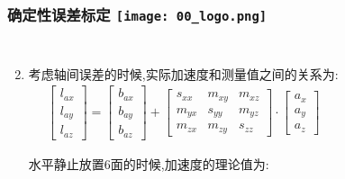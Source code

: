 \begin{comment}
\end{comment}
\begin{frame}
\frametitle{确定性误差标定 \hfill \texttt{[image: 00\_logo.png]}}
\begin{columns}
  
  
  \begin{enumerate}
    \setcounter{enumi}{1}
		\item 考虑轴间误差的时候,实际加速度和测量值之间的关系为:
		\begin{equation}
      \begin{split}
        \begin{bmatrix}
          l_{ax} \\ l_{ay} \\ l_{az}
        \end{bmatrix} = 
        \begin{bmatrix}
          b_{ax} \\ b_{ay} \\ b_{az}
        \end{bmatrix} +
        \begin{bmatrix}
          s_{xx} & m_{xy} & m_{xz} \\
          m_{yx} & s_{yy} & m_{yz} \\
          m_{zx} & m_{zy} & s_{zz}
        \end{bmatrix} \cdot 
        \begin{bmatrix}
          a_x \\ a_y \\ a_z
        \end{bmatrix}
      \end{split}
    \end{equation}

    水平静止放置6面的时候,加速度的理论值为:


\end{enumerate}
\end{columns}
\end{frame}
